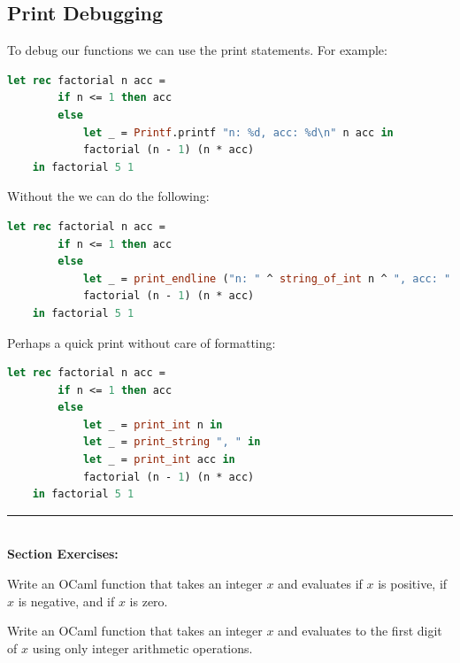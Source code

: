 \newpage 

\subsection{Print Debugging}

To debug our functions we can use the print statements. For example:

\begin{lstlisting}[language=OCaml, caption={Print Debugging}]
    let rec factorial n acc =
        if n <= 1 then acc
        else 
            let _ = Printf.printf "n: %d, acc: %d\n" n acc in
            factorial (n - 1) (n * acc)
    in factorial 5 1
\end{lstlisting}

\noindent
Without the  we can do the following:

\begin{lstlisting}[language=OCaml, caption={Print Debugging Without Printf}]
    let rec factorial n acc =
        if n <= 1 then acc
        else 
            let _ = print_endline ("n: " ^ string_of_int n ^ ", acc: " ^ string_of_int acc) in
            factorial (n - 1) (n * acc)
    in factorial 5 1
\end{lstlisting}

\noindent
Perhaps a quick print without care of formatting:

\begin{lstlisting}[language=OCaml, caption={Dirty Print Debugging}]
    let rec factorial n acc =
        if n <= 1 then acc
        else 
            let _ = print_int n in
            let _ = print_string ", " in
            let _ = print_int acc in
            factorial (n - 1) (n * acc)
    in factorial 5 1
\end{lstlisting}

\vspace{1em}
\noindent
\rule{\textwidth}{0.4pt}\\
\textbf{Section Exercises:}\\

\begin{Exercise}
Write an OCaml function that takes an integer $x$ and evaluates  if $x$ is positive,  if $x$ is negative, and  if $x$ is zero.
\end{Exercise}
    
    
\vspace{1em}
\begin{Exercise}
Write an OCaml function that takes an integer $x$ and evaluates to the first digit of $x$ using only integer arithmetic operations.
\end{Exercise}


